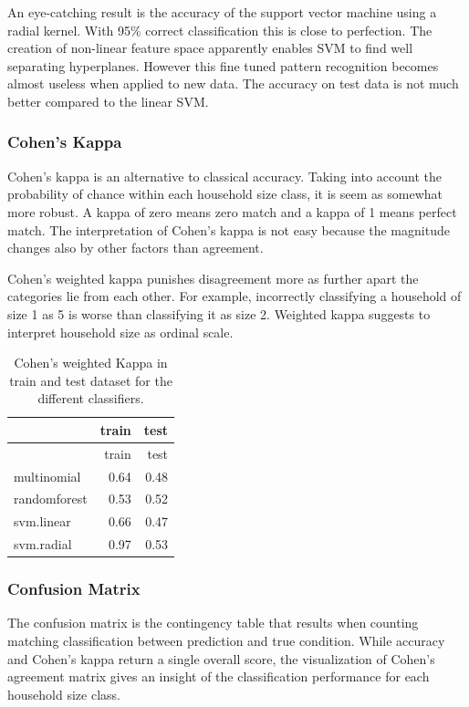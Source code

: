 \documentclass[]{article}
\begin{document}
An eye-catching result is the accuracy of the support vector machine
using a radial kernel. With 95\% correct classification this is close to
perfection. The creation of non-linear feature space apparently enables
SVM to find well separating hyperplanes. However this fine tuned pattern
recognition becomes almost useless when applied to new data. The
accuracy on test data is not much better compared to the linear SVM.

\hypertarget{cohens-kappa}{%
\subsubsection{Cohen's Kappa}\label{cohens-kappa}}

Cohen's kappa is an alternative to classical accuracy. Taking into
account the probability of chance within each household size class, it
is seem as somewhat more robust. A kappa of zero means zero match and a
kappa of 1 means perfect match. The interpretation of Cohen's kappa is
not easy because the magnitude changes also by other factors than
agreement.

Cohen's weighted kappa punishes disagreement more as further apart the
categories lie from each other. For example, incorrectly classifying a
household of size 1 as 5 is worse than classifying it as size 2.
Weighted kappa suggests to interpret household size as ordinal scale.

\begin{longtable}[]{@{}lrr@{}}
\caption{\label{tab:tab8} Cohen's weighted Kappa in train and test
dataset for the different classifiers.}\tabularnewline
\toprule
& train & test\tabularnewline
\midrule
\endfirsthead
\toprule
& train & test\tabularnewline
\midrule
\endhead
multinomial & 0.64 & 0.48\tabularnewline
randomforest & 0.53 & 0.52\tabularnewline
svm.linear & 0.66 & 0.47\tabularnewline
svm.radial & 0.97 & 0.53\tabularnewline
\bottomrule
\end{longtable}

\hypertarget{confusion-matrix}{%
\subsubsection{Confusion Matrix}\label{confusion-matrix}}

The confusion matrix is the contingency table that results when counting
matching classification between prediction and true condition. While
accuracy and Cohen's kappa return a single overall score, the
visualization of Cohen's agreement matrix gives an insight of the
classification performance for each household size class.
\end{document}
